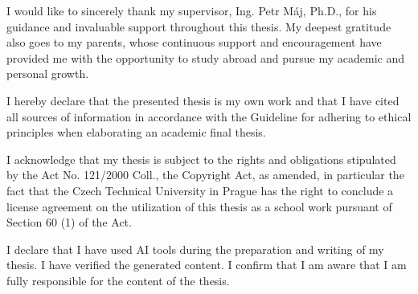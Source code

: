 \documentclass[english,bachelor,unicode,oneside]{ctufit-thesis}
\begin{document}
\frontmatter\frontmatterinit %

\thispagestyle{empty}\maketitle\thispagestyle{empty}\cleardoublepage %


\imprintpage %
\stopTOCentries

\begin{acknowledgmentpage}
    I would like to sincerely thank my supervisor, Ing. Petr Máj, Ph.D., for his guidance and invaluable support throughout this thesis. My deepest gratitude also goes to my parents, whose continuous support and encouragement have provided me with the opportunity to study abroad and pursue my academic and personal growth.
\end{acknowledgmentpage}


\begin{declarationpage}
I hereby declare that the presented thesis is my own work and that I have cited all sources of
information in accordance with the Guideline for adhering to ethical principles when elaborating an
academic final thesis.

I acknowledge that my thesis is subject to the rights and obligations stipulated by the Act No.
121/2000 Coll., the Copyright Act, as amended, in particular the fact that the Czech Technical
University in Prague has the right to conclude a license agreement on the utilization of this thesis as
a school work pursuant of Section 60 (1) of the Act.

I declare that I have used AI tools during the preparation and writing of my thesis. I have verified
the generated content. I confirm that I am aware that I am fully responsible for the content of the
thesis.
\end{declarationpage}
\end{document}
